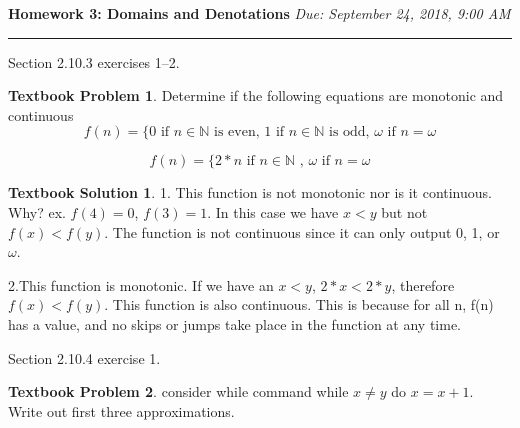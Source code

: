 \documentclass[10pt]{article}
\theoremstyle{definition}
\newtheorem{bp}{Textbook Problem}
\newtheorem{ts}{Textbook Solution}
\begin{document}
    
    
    
    \noindent
    
    \textbf{Homework 3: Domains and Denotations} \hfill \emph{Due: September 24, 2018, 9:00 AM}
    
    \hrule
    
    
    
    \vspace{.3in}
    
    
    
    Section 2.10.3 exercises 1--2.
    
    
    
    \begin{bp}
    Determine if the following equations are monotonic and continuous
    \begin{equation}
    f(n) = \{ 0 \textrm{ if } n \in \mathds{N} \textrm{ is even, } 1 \textrm{ if } n \in \mathds{N} \textrm{ is odd, } \omega \textrm{ if } n = \omega
    \end{equation}
    
    \begin{equation}
    f(n) = \{ 2*n \textrm{ if } n \in \mathds{N} \textrm{ , } \omega \textrm{ if } n = \omega 
    \end{equation}
    
    \end{bp}
    
    \begin{ts}
    
    1. This function is not monotonic nor is it continuous. Why? ex. $f(4) = 0$, $f(3) = 1$. In this case we have $x < y$ but not $f(x) < f(y)$. The function is not continuous since it can only output 0, 1, or $\omega$.
    
    2.This function is monotonic. If we have an $x < y$, $2*x < 2*y$, therefore $f(x) < f(y)$. This function is also continuous. This is because for all n, f(n) has a value, and no skips or jumps take place in the function at any time.  
    \end{ts}
    
    
    
    Section 2.10.4 exercise 1.
    
    \begin{bp}
    
    consider while command while $ x \neq y $ do $x = x + 1 $. Write out first three approximations.
    \end{bp}
    
\end{document}
